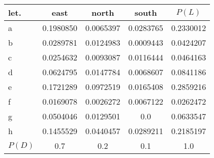 \begin{margintable}
  \caption{\label{tbl:marginal-prob-table2}%
    Joint probability table for letters and dialects
    with marginal probabilities.
    $P(D)$ is the (marginal) probability of dialects,
    and $P(L)$ is the probability of letters in the corpus.
    This is the same as Table~\ref{tbl:marginal-prob-table},
    repeated here for convenience.
  }
  \begin{center}
    \setlength{\tabcolsep}{4pt}
    \begin{tabular}{lS[round-precision=2]S[round-precision=2]S[round-precision=2]|S[round-precision=2]}
      \toprule
      let. & {east} & {north} & {south} & {$P(L)$} \\
      \midrule
      a & 0.1980850&0.0065397&0.0283765 & 0.2330012\\
      b & 0.0289781&0.0124983&0.0009443 & 0.0424207\\
      c & 0.0254632&0.0093087&0.0116444 & 0.0464163\\
      d & 0.0624795&0.0147784&0.0068607 & 0.0841186\\
      e & 0.1721289&0.0972519&0.0165408 & 0.2859216\\
      f & 0.0169078&0.0026272&0.0067122 & 0.0262472\\
      g & 0.0504046&0.0129501&0.0       & 0.0633547\\
      h & 0.1455529&0.0440457&0.0289211 & 0.2185197\\
      \midrule
      $P(D)$  & 0.7&0.2&0.1 & 1.0\\
      \bottomrule
    \end{tabular}
  \end{center}
\end{margintable}
